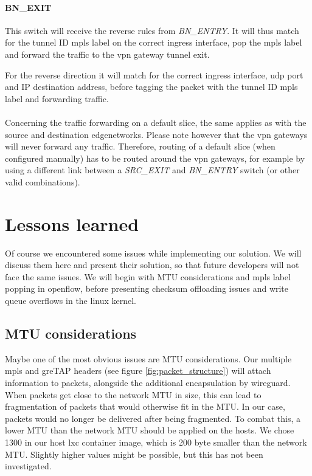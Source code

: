 \paragraph{BN\_EXIT} This switch will receive the reverse rules from \textit{BN\_ENTRY}. It will thus match for the tunnel ID \acrshort{mpls} label on the correct ingress interface, pop the \acrshort{mpls} label and forward the traffic to the \acrshort{vpn} gateway tunnel exit.

For the reverse direction it will match for the correct ingress interface, \acrshort{udp} port and IP destination address, before tagging the packet with the tunnel ID \acrshort{mpls} label and forwarding traffic.

\paragraph{} Concerning the traffic forwarding on a default slice, the same applies as with the source and destination \gls{edgenetwork}s. Please note however that the \acrshort{vpn} gateways will never forward any traffic. Therefore, routing of a default slice (when configured manually) has to be routed around the \acrshort{vpn} gateways, for example by using a different link between a \textit{SRC\_EXIT} and \textit{BN\_ENTRY} switch (or other valid combinations).


\section{Lessons learned}
Of course we encountered some issues while implementing our solution. We will discuss them here and present their solution, so that future developers will not face the same issues. We will begin with MTU considerations and \acrshort{mpls} label popping in \Gls{openflow}, before presenting checksum offloading issues and write queue overflows in the linux kernel.


\subsection{MTU considerations}
Maybe one of the most obvious issues are MTU considerations. Our multiple \acrshort{mpls} and \acrshort{gre}TAP headers (see figure \ref{fig:packet_structure}) will attach information to packets, alongside the additional encapsulation by \gls{wireguard}. When packets get close to the network MTU in size, this can lead to fragmentation of packets that would otherwise fit in the MTU. In our case, packets would no longer be delivered after being fragmented. To combat this, a lower MTU than the network MTU should be applied on the hosts. We chose 1300 in our host \acrshort{lxc} container image, which is 200 byte smaller than the network MTU. Slightly higher values might be possible, but this has not been investigated.

